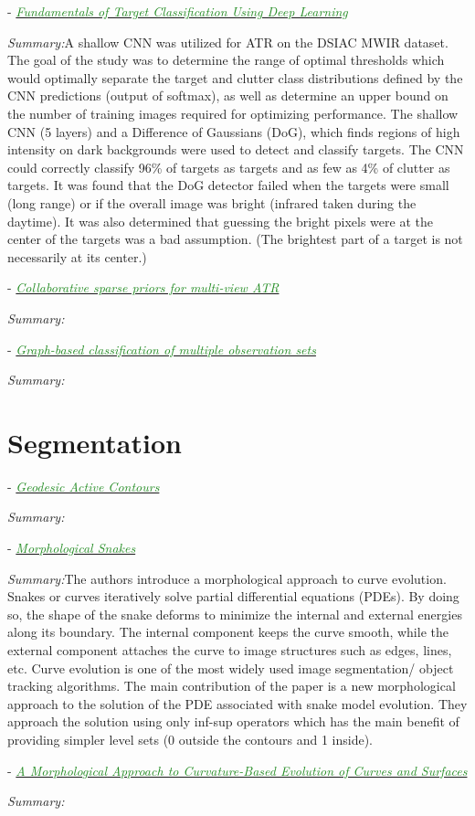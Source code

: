 \documentclass[]{article}
\newcommand{\paperentry}[4]{
            \hangindent=1cm
            \cite{#1} - \href{run:../References/#3}{\textcolor{ForestGreen}{\textit{#2}}}
            
            \noindent            
            \begin{minipage}[t]{0.1\linewidth}\hfill\end{minipage}
            \begin{minipage}[t]{0.8\linewidth}\textcolor{NavyBlue}{{\textit{Summary:}}}#4\end{minipage}
            \vspace{.25cm}
          }
\begin{document}
\paperentry{Tanner2019DSIACNeuralNet}
{Fundamentals of Target Classification Using Deep Learning}
{Army/Tanner2019DSIACNeuralNet.pdf}
{A shallow CNN was utilized for ATR on the DSIAC MWIR dataset.  The goal of the study was to determine the range of optimal thresholds which would optimally separate the target and clutter class distributions defined by the CNN predictions (output of softmax), as well as determine an upper bound on the number of training images required for optimizing performance.  The shallow CNN (5 layers) and a Difference of Gaussians (DoG), which finds regions of high intensity on dark backgrounds were used to detect and classify targets.  The CNN could correctly classify 96\% of targets as targets and as few as 4\% of clutter as targets.  It was found that the DoG detector failed when the targets were small (long range) or if the overall image was bright (infrared taken during the daytime).  It was also determined that guessing the bright pixels were at the center of the targets was a bad assumption. (The brightest part of a target is not necessarily at its center.)}

\paperentry{Li2018CollaborativeSparsePriorsMultiViewATR}
{Collaborative sparse priors for multi-view ATR}
{Army/Li2018CollaborativeSparsePriorsMultiViewATR.pdf}
{}

\paperentry{Kokiopoulou2009GraphBasedClassificationMultipleObsSets}
{Graph-based classification of multiple observation sets}
{Army/Kokiopoulou2009GraphBasedClassificationMultipleObsSets.pdf}
{}


\section{Segmentation}
	\paperentry{Caselles1997GeodesicActiveContours}
	{Geodesic Active Contours}
	{Segmentation/Caselles1997GeodesicActiveContours.pdf}
	{}
	
	\paperentry{Alvarez2010MorphologicalSnakes}
	{Morphological Snakes}
	{Segmentation/Alvarez2010MorphologicalSnakes.pdf}
	{The authors introduce a morphological approach to curve evolution.  Snakes or curves iteratively solve partial differential equations (PDEs).  By doing so, the shape of the snake deforms to minimize the internal and external energies along its boundary.  The internal component keeps the curve smooth, while the external component attaches the curve to image structures such as edges, lines, etc.  Curve evolution is one of the most widely used image segmentation/ object tracking algorithms.  The main contribution of the paper is a new morphological approach to the solution of the PDE associated with snake model evolution.  They approach the solution using only inf-sup operators which has the main benefit of providing simpler level sets (0 outside the contours and 1 inside).}
	
	\paperentry{Marquez_Neila2014MorphologicalCurveBasedEvolution}
	{A Morphological Approach to Curvature-Based Evolution of Curves and Surfaces}
	{Segmentation/Marquez_Neila2014MorphologicalCurveBasedEvolution.pdf}
	{}

\newpage



\end{document}
